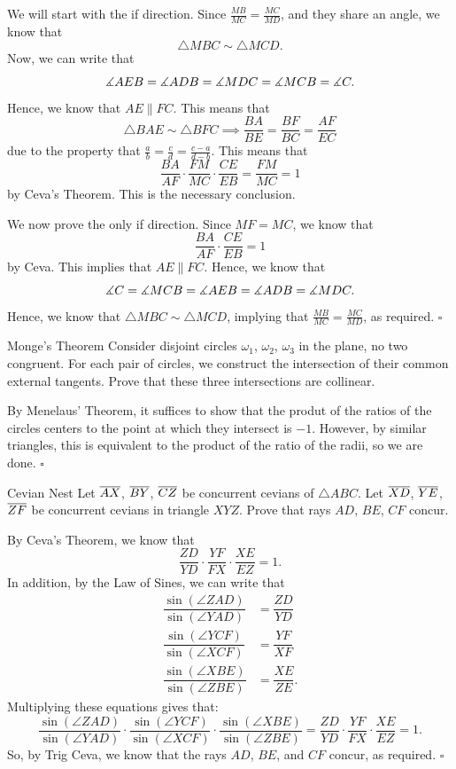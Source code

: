 \documentclass{article}
\begin{document}
We will start with the if direction. Since $\frac{MB}{MC} = \frac{MC}{MD}$, and they share an angle, we know that \[\triangle MBC \sim \triangle MCD.\] Now, we can write that \[\measuredangle AEB = \measuredangle ADB = \measuredangle MDC = \measuredangle MCB = \measuredangle C.\] Hence, we know that $AE \parallel FC$. This means that \[\triangle BAE \sim \triangle BFC \implies \dfrac{BA}{BE} = \dfrac{BF}{BC} = \dfrac{AF}{EC}\] due to the property that $\tfrac{a}{b}=\tfrac{c}{d} = \tfrac{c-a}{d-b}$. This means that \[\dfrac{BA}{AF}\cdot\dfrac{FM}{MC}\cdot\dfrac{CE}{EB} = \dfrac{FM}{MC} = 1\] by Ceva's Theorem. This is the necessary conclusion.

We now prove the only if direction. Since $MF = MC$, we know that \[\dfrac{BA}{AF}\cdot\dfrac{CE}{EB} = 1\] by Ceva. This implies that $AE \parallel FC$. Hence, we know that \[\measuredangle C = \measuredangle MCB = \measuredangle AEB = \measuredangle ADB = \measuredangle MDC.\] Hence, we know that $\triangle MBC \sim \triangle MCD$, implying that $\frac{MB}{MC} = \frac{MC}{MD}$, as required. $\square$

\begin{problem}[3.22]{Monge's Theorem}
Consider disjoint circles $\omega_1$, $\omega_2$, $\omega_3$ in the plane, no two congruent. For each pair of circles, we construct the intersection of their common external tangents. Prove that these three intersections are collinear.
\end{problem}

By Menelaus' Theorem, it suffices to show that the produt of the ratios of the circles centers to the point at which they intersect is $-1$. However, by similar triangles, this is equivalent to the product of the ratio of the radii, so we are done. $\square$

\begin{problem}[3.23]{Cevian Nest}
Let $\overline{AX}$, $\overline{BY}$, $\overline{CZ}$ be concurrent cevians of $\triangle ABC$. Let $\overline{XD}$, $\overline{YE}$, $\overline{ZF}$ be concurrent cevians in triangle $XYZ$. Prove that rays $AD$, $BE$, $CF$ concur.
\end{problem}

By Ceva's Theorem, we know that \[\dfrac{ZD}{YD}\cdot\dfrac{YF}{FX}\cdot\dfrac{XE}{EZ} = 1.\] In addition, by the Law of Sines, we can write that 
\begin{align*}
\dfrac{\sin(\angle ZAD)}{\sin(\angle YAD)} &= \dfrac{ZD}{YD} \\
\dfrac{\sin(\angle YCF)}{\sin(\angle XCF)} &= \dfrac{YF}{XF} \\
\dfrac{\sin(\angle XBE)}{\sin(\angle ZBE)} &= \dfrac{XE}{ZE}.
\end{align*}
Multiplying these equations gives that: \[\dfrac{\sin(\angle ZAD)}{\sin(\angle YAD)}\cdot\dfrac{\sin(\angle YCF)}{\sin(\angle XCF)}\cdot\dfrac{\sin(\angle XBE)}{\sin(\angle ZBE)} = \dfrac{ZD}{YD}\cdot\dfrac{YF}{FX}\cdot\dfrac{XE}{EZ} = 1.\] So, by Trig Ceva, we know that the rays $AD$, $BE$, and $CF$ concur, as required. $\square$
\end{document}
